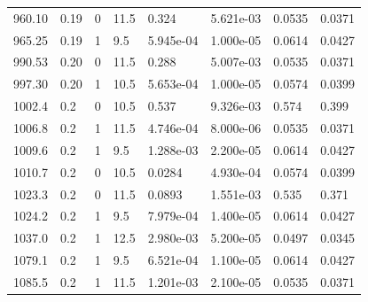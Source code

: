 \documentclass[preview]{standalone}
\begin{document}
{{{\begin{tabular}{L{1.2cm}C{1.2cm} C{0.3cm}C{0.5cm} C{1.4cm}C{1.4cm} C{1.4cm}C{1.4cm}}
  960.10  &  0.19  & 0     & 11.5 &  0.324  & 5.621e-03  & 0.0535 &  0.0371   \\ 
  965.25  &  0.19  & 1     & 9.5 &  5.945e-04  & 1.000e-05  & 0.0614 &  0.0427   \\ 
  990.53  &  0.20  & 0     & 11.5 &  0.288  & 5.007e-03  & 0.0535 &  0.0371   \\ 
  997.30  &  0.20  & 1     & 10.5 &  5.653e-04  & 1.000e-05  & 0.0574 &  0.0399   \\ 
  1002.4  &   0.2  & 0     & 10.5 &  0.537  & 9.326e-03  & 0.574 &  0.399   \\ 
  1006.8  &   0.2  & 1     & 11.5 &  4.746e-04  & 8.000e-06  & 0.0535 &  0.0371   \\ 
  1009.6  &   0.2  & 1     & 9.5 &  1.288e-03  & 2.200e-05  & 0.0614 &  0.0427   \\ 
  1010.7  &   0.2  & 0     & 10.5 &  0.0284  & 4.930e-04  & 0.0574 &  0.0399   \\ 
  1023.3  &   0.2  & 0     & 11.5 &  0.0893  & 1.551e-03  & 0.535 &  0.371   \\ 
  1024.2  &   0.2  & 1     & 9.5 &  7.979e-04  & 1.400e-05  & 0.0614 &  0.0427   \\ 
  1037.0  &   0.2  & 1     & 12.5 &  2.980e-03  & 5.200e-05  & 0.0497 &  0.0345   \\ 
  1079.1  &   0.2  & 1     & 9.5 &  6.521e-04  & 1.100e-05  & 0.0614 &  0.0427   \\ 
  1085.5  &   0.2  & 1     & 11.5 &  1.201e-03  & 2.100e-05  & 0.0535 &  0.0371   \\ 
\hline 
\end{tabular} 

}}}
\end{document}
